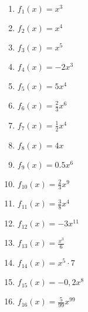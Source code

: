 \begin{minipage}{\textwidth}
	\begin{Exercise}[title={\raggedright Berechne jeweils allgemein die Ableitung \(f'(x)\)}, label=potenzregelA1]
		\begin{minipage}{\textwidth}
			\begin{minipage}{0.49\textwidth}
				\begin{enumerate}[label=\alph*)]
					\item \(f_1(x)=x^3\)
					\item \(f_2(x)=x^4\)
					\item \(f_3(x)=x^5\)
					\item \(f_4(x)=-2x^3\)
					\item \(f_5(x)=5x^4\)
					\item \(f_6(x)=\frac{2}{3}x^6\)
					\item \(f_7(x)=\frac{1}{2}x^4\)
					\item \(f_8(x)=4x\)
				\end{enumerate}
			\end{minipage}
			\begin{minipage}{0.49\textwidth}
				\begin{enumerate}[label=\alph*)]
					\setcounter{enumi}{8}
					\item \(f_9(x)=0.5x^6\)
					\item \(f_{10}(x)=\frac{2}{3}x^9\)
					\item \(f_{11}(x)=\frac{3}{8}x^4\)
					\item \(f_{12}(x)=-3x^{11}\)
					\item \(f_{13}(x)=\frac{x^3}{6}\)
					\item \(f_{14}(x)=x^5\cdot 7\)
					\item \(f_{15}(x)=-0,2x^8\)
					\item \(f_{16}(x)=\frac{5}{99}x^{99}\)
				\end{enumerate}
			\end{minipage}
		\end{minipage}
	\end{Exercise}
\end{minipage}
